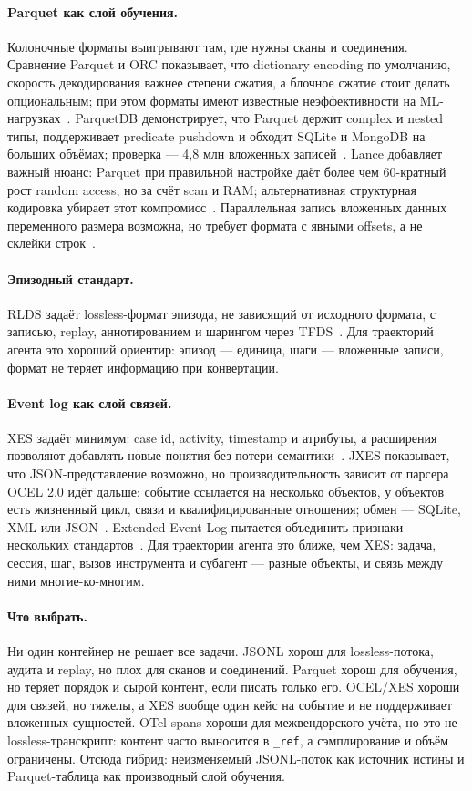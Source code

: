 \documentclass[11pt,a4paper]{article}
\begin{document}
\paragraph{Parquet как слой обучения.}
Колоночные форматы выигрывают там, где нужны сканы и соединения.
Сравнение Parquet и ORC показывает, что dictionary encoding по умолчанию,
скорость декодирования важнее степени сжатия, а блочное сжатие стоит
делать опциональным; при этом форматы имеют известные неэффективности на
ML-нагрузках~\cite{zeng2023columnar}. ParquetDB демонстрирует, что Parquet
держит complex и nested типы, поддерживает predicate pushdown и обходит
SQLite и MongoDB на больших объёмах; проверка — 4,8 млн вложенных
записей~\cite{lang2025parquetdb}. Lance добавляет важный нюанс: Parquet при
правильной настройке даёт более чем 60-кратный рост random access, но за
счёт scan и RAM; альтернативная структурная кодировка убирает этот
компромисс~\cite{pace2025lance}. Параллельная запись вложенных данных
переменного размера возможна, но требует формата с явными offsets, а не
склейки строк~\cite{hahnfeld2024nested}.

\paragraph{Эпизодный стандарт.}
RLDS задаёт lossless-формат эпизода, не зависящий от исходного формата, с
записью, replay, аннотированием и шарингом через TFDS~\cite{ramos2021rlds}.
Для траекторий агента это хороший ориентир: эпизод — единица, шаги —
вложенные записи, формат не теряет информацию при конвертации.

\paragraph{Event log как слой связей.}
XES задаёт минимум: case id, activity, timestamp и атрибуты, а расширения
позволяют добавлять новые понятия без потери
семантики~\cite{wynn2024xes}. JXES показывает, что JSON-представление
возможно, но производительность зависит от парсера~\cite{shankara2020jxes}.
OCEL 2.0 идёт дальше: событие ссылается на несколько объектов, у объектов
есть жизненный цикл, связи и квалифицированные отношения; обмен — SQLite,
XML или JSON~\cite{berti2024ocel}. Extended Event Log пытается объединить
признаки нескольких стандартов~\cite{suleiman2024extended}. Для траектории
агента это ближе, чем XES: задача, сессия, шаг, вызов инструмента и
субагент — разные объекты, и связь между ними многие-ко-многим.

\paragraph{Что выбрать.}
Ни один контейнер не решает все задачи. JSONL хорош для lossless-потока,
аудита и replay, но плох для сканов и соединений. Parquet хорош для
обучения, но теряет порядок и сырой контент, если писать только его.
OCEL/XES хороши для связей, но тяжелы, а XES вообще один кейс на событие и
не поддерживает вложенных сущностей. OTel spans хороши для межвендорского
учёта, но это не lossless-транскрипт: контент часто выносится в
\texttt{\_ref}, а сэмплирование и объём ограничены. Отсюда гибрид:
неизменяемый JSONL-поток как источник истины и Parquet-таблица как
производный слой обучения.
\end{document}
